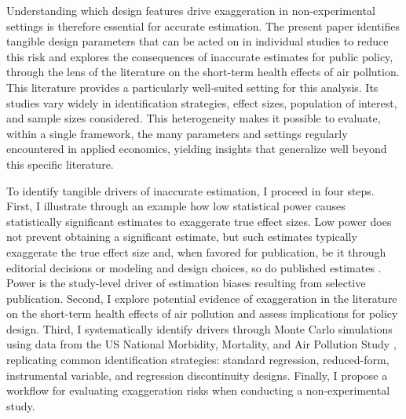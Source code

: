 \documentclass[12pt]{article}
\begin{document}
		Understanding which design features drive exaggeration in non-experimental settings is therefore essential for accurate estimation. The present paper identifies tangible design parameters that can be acted on in individual studies to reduce this risk and explores the consequences of inaccurate estimates for public policy, through the lens of the literature on the short-term health effects of air pollution. This literature provides a particularly well-suited setting for this analysis. Its studies vary widely in identification strategies, effect sizes, population of interest, and sample sizes considered. This heterogeneity makes it possible to evaluate, within a single framework, the many parameters and settings regularly encountered in applied economics, yielding insights that generalize well beyond this specific literature.
		
		 To identify tangible drivers of inaccurate estimation, I proceed in four steps. First, I illustrate through an example how low statistical power causes statistically significant estimates to exaggerate true effect sizes. Low power does not prevent obtaining a significant estimate, but such estimates typically exaggerate the true effect size and, when favored for publication, be it through editorial decisions or modeling and design choices, so do published estimates \citep{gelman_type_2000, ioannidis_why_2008, gelman_beyond_2014}. Power is the study-level driver of estimation biases resulting from selective publication. Second, I explore potential evidence of exaggeration in the literature on the short-term health effects of air pollution and assess implications for policy design. Third, I systematically identify drivers through Monte Carlo simulations using data from the US National Morbidity, Mortality, and Air Pollution Study \citep{samet_national_2000}, replicating common identification strategies: standard regression, reduced-form, instrumental variable, and regression discontinuity designs. Finally, I propose a workflow for evaluating exaggeration risks when conducting a non-experimental study.
		 
\end{document}
